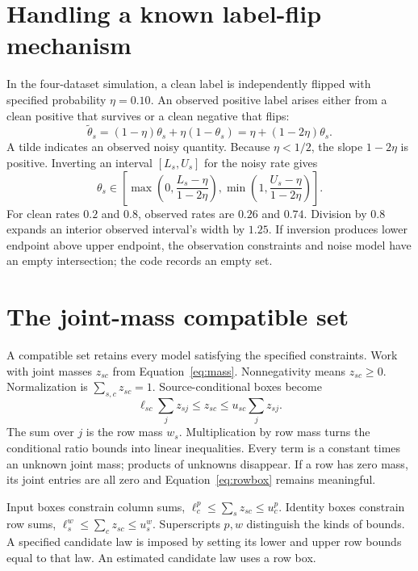 \documentclass[11pt,a4paper]{report}
\begin{document}
\section{Handling a known label-flip mechanism}
In the four-dataset simulation, a clean label is independently flipped with specified probability $\eta=0.10$. An observed positive label arises either from a clean positive that survives or a clean negative that flips:
\begin{equation}
\widetilde\theta_s=(1-\eta)\theta_s+\eta(1-\theta_s)
=\eta+(1-2\eta)\theta_s.
\end{equation}
A tilde indicates an observed noisy quantity. Because $\eta<1/2$, the slope $1-2\eta$ is positive. Inverting an interval $[L_s,U_s]$ for the noisy rate gives
\begin{equation}
\theta_s\in\left[\max\left(0,\frac{L_s-\eta}{1-2\eta}\right),
\min\left(1,\frac{U_s-\eta}{1-2\eta}\right)\right].
\end{equation}
For clean rates $0.2$ and $0.8$, observed rates are $0.26$ and $0.74$. Division by $0.8$ expands an interior observed interval's width by $1.25$. If inversion produces lower endpoint above upper endpoint, the observation constraints and noise model have an empty intersection; the code records an empty set.

\section{The joint-mass compatible set}
A compatible set retains every model satisfying the specified constraints. Work with joint masses $z_{sc}$ from Equation~\eqref{eq:mass}. Nonnegativity means $z_{sc}\geq0$. Normalization is $\sum_{s,c}z_{sc}=1$. Source-conditional boxes become
\begin{equation}
\ell_{sc}\sum_jz_{sj}\leq z_{sc}\leq u_{sc}\sum_jz_{sj}.
\label{eq:rowbox}
\end{equation}
The sum over $j$ is the row mass $w_s$. Multiplication by row mass turns the conditional ratio bounds into linear inequalities. Every term is a constant times an unknown joint mass; products of unknowns disappear. If a row has zero mass, its joint entries are all zero and Equation~\eqref{eq:rowbox} remains meaningful.

Input boxes constrain column sums, $\ell^p_c\leq\sum_sz_{sc}\leq u^p_c$. Identity boxes constrain row sums, $\ell^w_s\leq\sum_cz_{sc}\leq u^w_s$. Superscripts $p,w$ distinguish the kinds of bounds. A specified candidate law is imposed by setting its lower and upper row bounds equal to that law. An estimated candidate law uses a row box.
\end{document}
